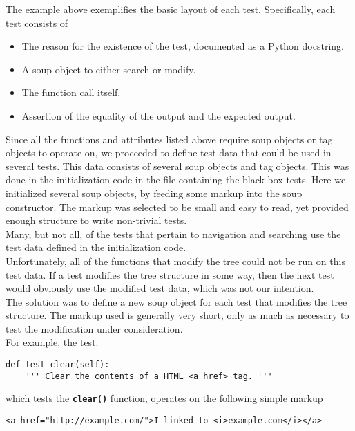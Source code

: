 \documentclass[10pt]{article}
\newcommand{\tbt}[1]{\texttt{\textbf{#1}}}
\begin{document}
The example above exemplifies the basic layout of each test. Specifically, each test consists of 
\begin{itemize}
  \item The reason for the existence of the test, documented as a Python docstring.
  \item A soup object to either search or modify.
  \item The function call itself.  
  \item Assertion of the equality of the output and the expected output.
\end{itemize}

Since all the functions and attributes listed above require soup objects or tag objects to operate on, we proceeded to define test data that could be used in several tests. This data consists of several soup objects and tag objects. This was done in the initialization code in the file containing the black box tests. Here we initialized several soup objects, by feeding some markup into the soup constructor. The markup was selected to be small and easy to read, yet provided enough structure to write non-trivial tests.  \\ 

Many, but not all, of the tests that pertain to navigation and searching use the test data defined in the initialization code. \\

Unfortunately, all of the functions that modify the tree could not be run on this test data. If a test modifies the tree structure in some way, then the next test would obviously use the modified test data, which was not our intention. \\

The solution was to define a new soup object for each test that modifies the tree structure. The markup used is generally very short, only as much as necessary to test the modification under consideration. \\

For example, the test: 
\begin{lstlisting}[style = pythonstyle]
    def test_clear(self):
    ''' Clear the contents of a HTML <a href> tag. '''
\end{lstlisting}
which tests the \tbt{clear()} function, operates on the following simple markup
\begin{lstlisting}[style = htmlstyle]
  <a href="http://example.com/">I linked to <i>example.com</i></a>
\end{lstlisting}
\end{document}
